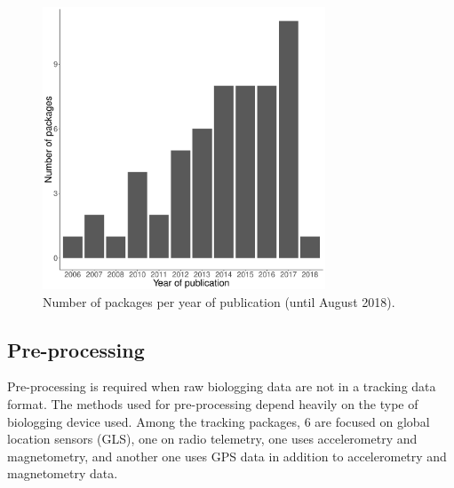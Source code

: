 \documentclass[a4paper,12pt]{article}
\begin{document}
	
	\begin{figure}
		\centering
		\includegraphics[width=0.75\textwidth]{./mes_images/packages_per_year.pdf}
		\caption{\label{fig:PkgYear} Number of packages per year of publication (until August 2018).}
	\end{figure} 
	
	\subsection*{Pre-processing} 
	
	Pre-processing is required when raw biologging data are not in a tracking data format. The methods used for pre-processing depend heavily on the type of biologging device used. Among the tracking packages, 6 are focused on global location sensors (GLS), one on radio telemetry, one uses accelerometry and magnetometry, and another one uses GPS data in addition to accelerometry and magnetometry data. %
	
\end{document}
